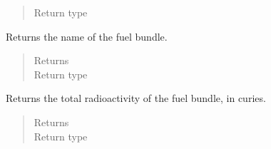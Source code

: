 \documentclass[letterpaper,10pt,openany,oneside,english]{sphinxmanual}
\begin{document}
\begin{fulllineitems}
\begin{fulllineitems}
\begin{quote}
\begin{description}
\item[{Return type}] \leavevmode
{}

\end{description}\end{quote}

\end{fulllineitems}


\begin{fulllineitems}
\label{\detokenize{support_rst/fuel_bundle:fuel_bundle.FuelBundle.get_name}}
Returns the name of the fuel bundle.
\begin{quote}\begin{description}
\item[{Returns}] \leavevmode
{}

\item[{Return type}] \leavevmode
{}

\end{description}\end{quote}

\end{fulllineitems}


\begin{fulllineitems}
\label{\detokenize{support_rst/fuel_bundle:fuel_bundle.FuelBundle.get_radioactivity}}
Returns the total radioactivity of the fuel bundle, in curies.
\begin{quote}\begin{description}
\item[{Returns}] \leavevmode
{}

\item[{Return type}] \leavevmode
{}

\end{description}\end{quote}

\end{fulllineitems}



\end{fulllineitems}
\end{document}
